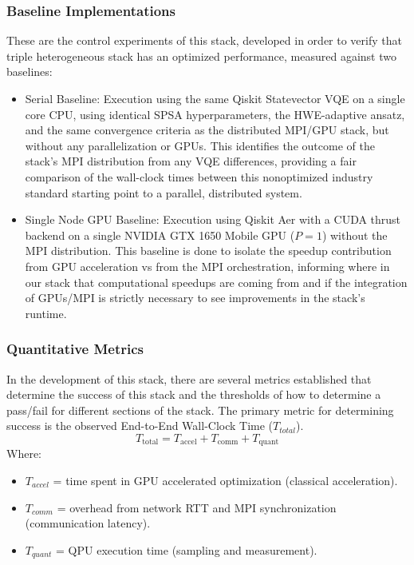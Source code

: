 \subsubsection{Baseline Implementations}
These are the control experiments of this stack, developed in order to verify that triple heterogeneous stack has an 
optimized performance, measured against two baselines: 
     \begin{itemize}
         \item Serial Baseline: Execution using the same Qiskit Statevector VQE on a single core CPU, using identical SPSA hyperparameters, the HWE-adaptive ansatz, and the same convergence criteria as the distributed MPI/GPU stack, but without any parallelization or GPUs. This identifies the outcome of the stack's MPI distribution from any VQE differences, providing a fair comparison of the wall-clock times between this nonoptimized industry standard starting point to a parallel, distributed system.
         \item Single Node GPU Baseline: Execution using Qiskit Aer with a CUDA thrust backend on a single NVIDIA GTX 1650 Mobile GPU ($P=1$) without the MPI distribution. This baseline is done to isolate the speedup contribution from GPU acceleration vs from the MPI orchestration, informing where in our stack that computational speedups are coming from and if the integration of GPUs/MPI is strictly necessary to see improvements in the stack's runtime.
     \end{itemize}
 
\subsubsection{Quantitative Metrics}
In the development of this stack, there are several metrics established that determine the success of this stack and the thresholds of how to determine
a pass/fail for different sections of the stack. The primary metric for determining success is the observed End-to-End Wall-Clock Time ($T_{total}$). 
   \begin{equation}
    T_{\text{total}} = T_{\text{accel}} + T_{\text{comm}} + T_{\text{quant}}
\end{equation}
Where: 
\begin{itemize}
    \item $T_{accel}$ = time spent in GPU accelerated optimization (classical acceleration).
    \item $T_{comm}$ = overhead from network RTT and MPI synchronization (communication latency).
    \item $T_{quant}$ = QPU execution time (sampling and measurement).
\end{itemize}

